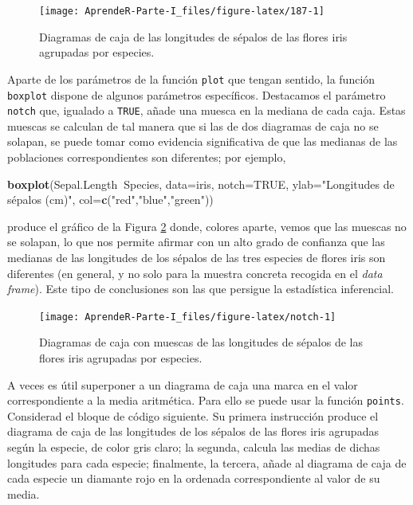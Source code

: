 \documentclass[]{book}
\newenvironment{Shaded}{\begin{snugshade}}{\end{snugshade}}
\newcommand{\DataTypeTok}[1]{\textcolor[rgb]{0.13,0.29,0.53}{#1}}
\newcommand{\KeywordTok}[1]{\textcolor[rgb]{0.13,0.29,0.53}{\textbf{#1}}}
\newcommand{\NormalTok}[1]{#1}
\newcommand{\OperatorTok}[1]{\textcolor[rgb]{0.81,0.36,0.00}{\textbf{#1}}}
\newcommand{\OtherTok}[1]{\textcolor[rgb]{0.56,0.35,0.01}{#1}}
\newcommand{\StringTok}[1]{\textcolor[rgb]{0.31,0.60,0.02}{#1}}
\theoremstyle{definition}
\theoremstyle{definition}
\theoremstyle{definition}
\theoremstyle{remark}
\begin{document}
\begin{figure}

{\centering \texttt{[image: AprendeR-Parte-I\_files/figure-latex/187-1]} 

}

\caption{Diagramas de caja de las longitudes de sépalos de las flores iris agrupadas por especies.}\label{fig:187}
\end{figure}

Aparte de los parámetros de la función \texttt{plot} que tengan sentido,
la función \texttt{boxplot} dispone de algunos parámetros específicos. Destacamos el parámetro \texttt{notch} que, igualado a \texttt{TRUE}, añade una muesca en la mediana de cada caja. Estas muescas se calculan de tal manera que si las de dos diagramas de caja no se solapan, se puede tomar como evidencia significativa de que las medianas de las poblaciones correspondientes son diferentes; por ejemplo,

\begin{Shaded}
\begin{Highlighting}[]
\KeywordTok{boxplot}\NormalTok{(Sepal.Length}\OperatorTok{~}\NormalTok{Species, }\DataTypeTok{data=}\NormalTok{iris, }\DataTypeTok{notch=}\OtherTok{TRUE}\NormalTok{, }
        \DataTypeTok{ylab=}\StringTok{"Longitudes de sépalos (cm)"}\NormalTok{, }\DataTypeTok{col=}\KeywordTok{c}\NormalTok{(}\StringTok{"red"}\NormalTok{,}\StringTok{"blue"}\NormalTok{,}\StringTok{"green"}\NormalTok{))}
\end{Highlighting}
\end{Shaded}

produce el gráfico de la Figura \ref{fig:notch} donde, colores aparte, vemos que las muescas no se solapan, lo que nos permite afirmar con un alto grado de confianza que las medianas de las longitudes de los sépalos de las tres especies de flores iris son diferentes (en general, y no solo para la muestra concreta recogida en el \emph{data frame}). Este tipo de conclusiones son las que persigue la estadística inferencial.

\begin{figure}

{\centering \texttt{[image: AprendeR-Parte-I\_files/figure-latex/notch-1]} 

}

\caption{Diagramas de caja con muescas de las longitudes de sépalos de las flores iris agrupadas por especies.}\label{fig:notch}
\end{figure}

A veces es útil superponer a un diagrama de caja una marca en el valor correspondiente a la media aritmética. Para ello se puede usar la función \texttt{points}. Considerad el bloque de código siguiente. Su primera instrucción produce el diagrama de caja de las longitudes de los sépalos de las flores iris agrupadas según la especie, de color gris claro; la segunda, calcula las medias de dichas longitudes para cada especie; finalmente, la tercera, añade al diagrama de caja de cada especie un diamante rojo en la ordenada correspondiente al valor de su media.
\end{document}
